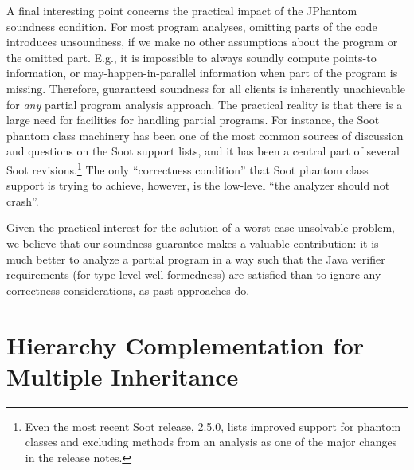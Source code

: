 
A final interesting point concerns the practical impact of the
JPhantom soundness condition. For most program analyses, omitting
parts of the code introduces unsoundness, if we make no other
assumptions about the program or the omitted part. E.g., it is
impossible to always soundly compute points-to information, or
may-happen-in-parallel information when part of the program is
missing. Therefore, guaranteed soundness for all clients is inherently
unachievable for \emph{any} partial program analysis approach. The
practical reality is that there is a large need for facilities for
handling partial programs. For instance, the Soot phantom class
machinery has been one of the most common sources of discussion and
questions on the Soot support lists, and it has been a central part of
several Soot revisions.\footnote{Even the most recent Soot release,
2.5.0, lists improved support for phantom classes and excluding
methods from an analysis as one of the major changes in the release
notes.} The only ``correctness condition'' that Soot phantom class
support is trying to achieve, however, is the low-level ``the analyzer
should not crash''.

Given the practical interest for the solution of a worst-case
unsolvable problem, we believe that our soundness guarantee makes a
valuable contribution: it is much better to analyze a partial program
in a way such that the Java verifier requirements (for type-level
well-formedness) are satisfied than to ignore any correctness
considerations, as past approaches do.




\section{Hierarchy Complementation for Multiple Inheritance}
\label{hiercomp/sect/multiple}

